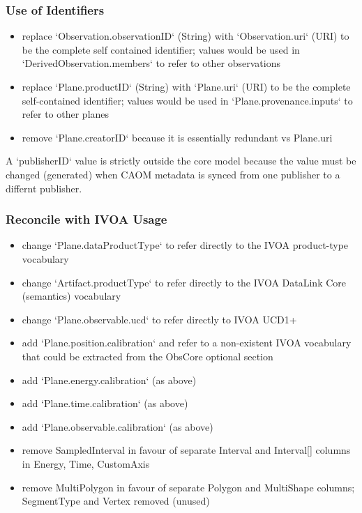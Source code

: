 \documentclass[11pt,a4paper]{ivoa}
\begin{document}
\subsubsection{Use of Identifiers}
\begin{itemize}
\item replace `Observation.observationID` (String) with `Observation.uri` (URI) to be the complete self contained identifier; values would be used in `DerivedObservation.members` to refer to other observations
  
\item replace `Plane.productID` (String) with `Plane.uri` (URI) to be the complete self-contained identifier; values would be used in `Plane.provenance.inputs` to refer to other planes

\item remove `Plane.creatorID` because it is essentially redundant vs Plane.uri
\end{itemize}

A `publisherID` value is strictly outside the core model because the value must be changed (generated) when CAOM metadata is synced from one publisher to a differnt publisher.

\subsubsection{Reconcile with IVOA Usage}

\begin{itemize}
\item change `Plane.dataProductType` to refer directly to the IVOA product-type vocabulary

\item change `Artifact.productType` to refer directly to the IVOA DataLink Core (semantics) vocabulary

\item change `Plane.observable.ucd` to refer directly to IVOA UCD1+

\item add `Plane.position.calibration` and refer to a non-existent IVOA vocabulary that could be extracted from the ObsCore optional section

\item add `Plane.energy.calibration` (as above)

\item add `Plane.time.calibration` (as above)

\item add `Plane.observable.calibration` (as above)

\item remove SampledInterval in favour of separate Interval and Interval[] columns in Energy, Time, CustomAxis

\item remove MultiPolygon in favour of separate Polygon and MultiShape columns; SegmentType and Vertex removed (unused)
\end{itemize}


\end{document}
